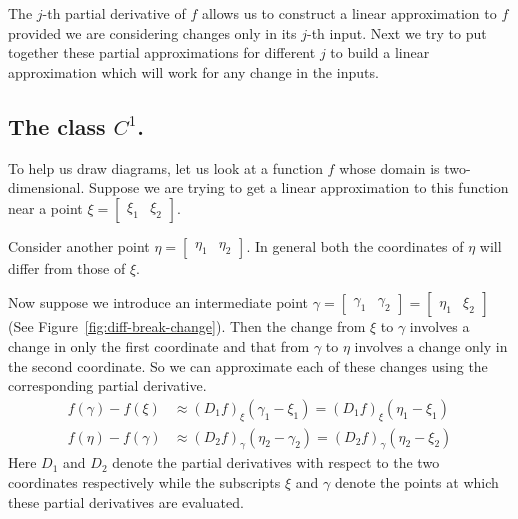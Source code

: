 \documentclass[11pt,reqno,openany]{amsbook}
\numberwithin{figure}{chapter}
\numberwithin{equation}{chapter}
\theoremstyle{plain}
\theoremstyle{definition}
\begin{document}
The $j$-th partial derivative of $f$ allows us to construct
a linear approximation to $f$ provided we are considering
changes only in its $j$-th input. Next we try to put
together these partial approximations for different $j$ to build a
linear approximation which will work for any change in the
inputs.

\subsection{The class $C^1$.}
To help us draw diagrams, let us look at a function $f$
whose domain is two-dimensional. Suppose we are trying to
get a linear approximation to this function near a point
$\xi = \begin{bmatrix} \xi_1 & \xi_2 \end{bmatrix}$.

Consider another point $\eta = \begin{bmatrix} \eta_1 &
  \eta_2 \end{bmatrix}$. In general both the coordinates of
$\eta$ will differ from those of $\xi$. 

Now suppose we introduce an intermediate point $\gamma
= \begin{bmatrix} \gamma_1 & \gamma_2\end{bmatrix}
= \begin{bmatrix} \eta_1 & \xi_2\end{bmatrix}$ (See Figure~\ref{fig:diff-break-change}). Then the
change from $\xi$ to $\gamma$ involves a change in only the
first coordinate and that from $\gamma$ to $\eta$ involves
a change only in the second coordinate. So we can approximate
each of these changes using the corresponding partial
derivative.
\begin{align}
  f(\gamma)-f(\xi) &\approx  (D_1 f)_{\xi}(\gamma_1-\xi_1)
   = (D_1 f)_{\xi}(\eta_1-\xi_1)\label{eq:diff-breakc-x}\\
  f(\eta)-f(\gamma) &\approx  (D_2 f)_{\gamma}(\eta_2-\gamma_2)
   = (D_2 f)_{\gamma}(\eta_2-\xi_2)\label{eq:diff-breakc-y}
\end{align}
Here $D_1$ and $D_2$ denote the partial derivatives with
respect to the two coordinates respectively while the
subscripts $\xi$ and $\gamma$ denote the points at which
these partial derivatives are evaluated.
\end{document}
